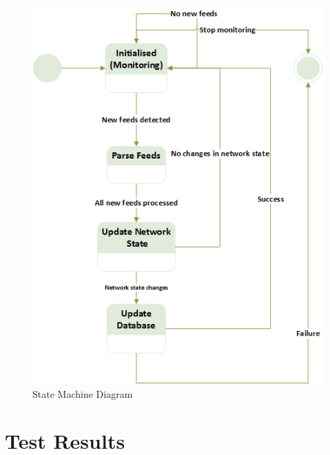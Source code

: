 \begin{figure}[!htb]
\centering
	\includegraphics[scale=1]{Figures/StateDiagram.jpg}
\caption{State Machine Diagram\label{overflow}}
\end{figure}

\section{Test Results}